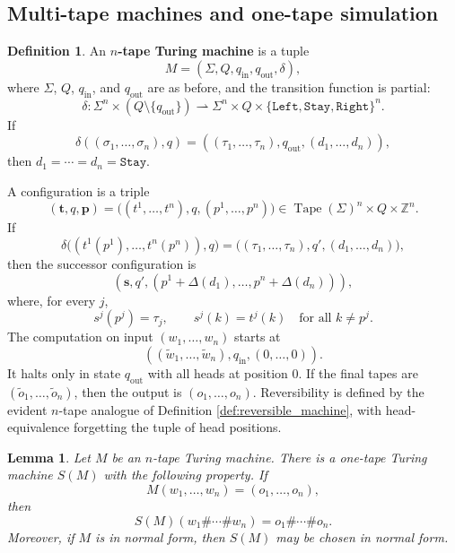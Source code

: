 \documentclass[12pt]{article}
\theoremstyle{plain}
\newtheorem{lemma}[thm]{Lemma}
\theoremstyle{definition}
\newtheorem{defn}[thm]{Definition}
\newcommand{\bb}[1]{\mathbb{#1}}
\newcommand{\Dir}{\{\texttt{Left},\texttt{Stay},\texttt{Right}\}}
\DeclareMathOperator{\Tape}{Tape}
\begin{document}
\subsection{Multi-tape machines and one-tape simulation}

\begin{defn}\label{def:ntape}
An \textbf{$n$-tape Turing machine} is a tuple
\[
M=(\Sigma,Q,q_{\mathrm{in}},q_{\mathrm{out}},\delta),
\]
where $\Sigma$, $Q$, $q_{\mathrm{in}}$, and $q_{\mathrm{out}}$ are as before, and the transition function is partial:
\[
\delta:\Sigma^n\times(Q\setminus\{q_{\mathrm{out}}\})\rightharpoonup \Sigma^n\times Q\times\Dir^n.
\]
If
\[
\delta((\sigma_1,\ldots,\sigma_n),q)=((\tau_1,\ldots,\tau_n),q_{\mathrm{out}},(d_1,\ldots,d_n)),
\]
then $d_1=\cdots=d_n=\texttt{Stay}$.

A configuration is a triple
\[
(\mathbf t,q,\mathbf p)=\big((t^1,\ldots,t^n),q,(p^1,\ldots,p^n)\big)
\in\Tape(\Sigma)^n\times Q\times\bb Z^n.
\]
If
\[
\delta\big((t^1(p^1),\ldots,t^n(p^n)),q\big)
=\big((\tau_1,\ldots,\tau_n),q',(d_1,\ldots,d_n)\big),
\]
then the successor configuration is
\[
(\mathbf s,q',(p^1+\Delta(d_1),\ldots,p^n+\Delta(d_n))),
\]
where, for every $j$,
\[
s^j(p^j)=\tau_j,
\qquad
s^j(k)=t^j(k)\quad\text{for all }k\neq p^j.
\]
The computation on input $(w_1,\ldots,w_n)$ starts at
\[
((\widetilde w_1,\ldots,\widetilde w_n),q_{\mathrm{in}},(0,\ldots,0)).
\]
It halts only in state $q_{\mathrm{out}}$ with all heads at position $0$. If the final tapes are $(\widetilde o_1,\ldots,\widetilde o_n)$, then the output is $(o_1,\ldots,o_n)$. Reversibility is defined by the evident $n$-tape analogue of Definition \ref{def:reversible_machine}, with head-equivalence forgetting the tuple of head positions.
\end{defn}

\begin{lemma}\label{lem:one_tape_simulation}
Let $M$ be an $n$-tape Turing machine. There is a one-tape Turing machine $S(M)$ with the following property. If
\[
M(w_1,\ldots,w_n)=(o_1,\ldots,o_n),
\]
then
\[
S(M)(w_1\#\cdots\#w_n)=o_1\#\cdots\#o_n.
\]
Moreover, if $M$ is in normal form, then $S(M)$ may be chosen in normal form.
\end{lemma}
\end{document}
